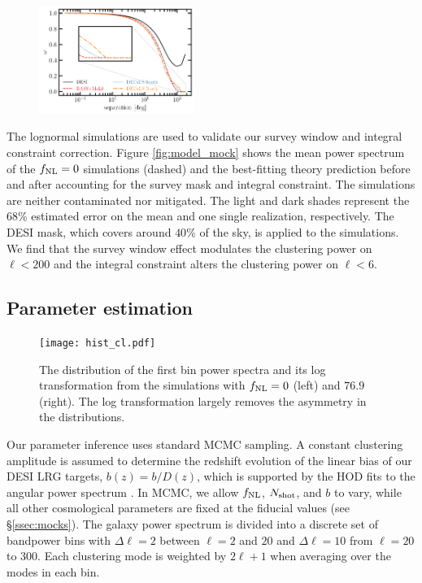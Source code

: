 \begin{figure}
    \centering
    \includegraphics[width=0.45\textwidth]{figures/mask_2pf.pdf}
    \caption{}
    \label{fig:mask2pf}
\end{figure}



The lognormal simulations are used to validate our survey window and integral constraint correction. Figure \ref{fig:model_mock} shows the mean power spectrum of the $f_{\rm NL}=0$ simulations (dashed) and the best-fitting theory prediction before and after accounting for the survey mask and integral constraint. The simulations are neither contaminated nor mitigated. The light and dark shades represent the 68\% estimated error on the mean and one single realization, respectively. The DESI mask, which covers around $40\%$ of the sky, is applied to the simulations. We find that the survey window effect modulates the clustering power on $\ell < 200$ and the integral constraint alters the clustering power on $\ell < 6$.

\subsection{Parameter estimation}

\begin{figure}
\centering
\texttt{[image: hist\_cl.pdf]}
\caption{The distribution of the first bin power spectra and its log transformation from the simulations with $f_{\rm NL}=0$ (left) and $76.9$ (right). The log transformation largely removes the asymmetry in the distributions.}\label{fig:histcell}
\end{figure}

Our parameter inference uses standard MCMC sampling. A constant clustering amplitude is assumed to determine the redshift evolution of the linear bias of our DESI LRG targets, $b(z) = b/D(z)$, which is supported by the HOD fits to the angular power spectrum \citep{zhou2021clustering}. In MCMC, we allow $f_{\rm NL}$, $N_{\rm shot}$, and $b$ to vary, while all other cosmological parameters are fixed at the fiducial values (see \S \ref{ssec:mocks}). The galaxy power spectrum is divided into a discrete set of bandpower bins with $\Delta\ell=2$ between $\ell=2$ and $20$ and $\Delta \ell=10$ from $\ell=20$ to $300$. Each clustering mode is weighted by $2\ell+1$ when averaging over the modes in each bin.

